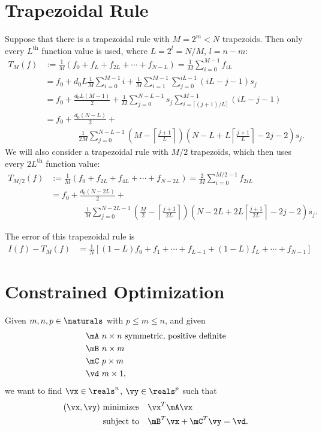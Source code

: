 \documentclass[]{amsart}
\theoremstyle{definition}
\theoremstyle{remark}
\begin{document}
\section{Trapezoidal Rule}
Suppose that there is a trapezoidal rule with $M=2^m<N$ trapezoids.  Then only every $L^{\text{th}}$ function value is used, where $L=2^l=N/M$, $l=n-m$:
\begin{align*}
T_M(f) &:= \frac{1}{M} ( f_0 + f_L + f_{2L} + \cdots + f_{N-L}) = \frac{1}{M} \sum_{i=0}^{M-1} f_{iL} \\
&= f_0 + d_0 L \frac{1}{M} \sum_{i=0}^{M-1} i + \frac{1}{M} \sum_{i=1}^{M-1}  \sum_{j=0}^{iL-1} (iL-j-1) s_j \\
&= f_0 + \frac{d_0 L(M-1)}{2} + \frac{1}{M} \sum_{j=0}^{N-L-1} s_j  \sum_{i=\lceil (j+1)/L \rceil }^{M-1}   (iL-j-1) \\
&= f_0 + \frac{d_0 (N-L)}{2} + \\
& \qquad \qquad \frac{1}{2M} \sum_{j=0}^{N-L-1} \left (M- \left\lceil \frac{j+1}{L} \right \rceil \right) \left (N - L + L\left\lceil \frac{j+1}{L} \right \rceil - 2j-2 \right)  s_j.
\end{align*}
We will also consider a trapezoidal rule with $M/2$ trapezoids, which then uses every $2L^{\text{th}}$ function value:
\begin{align*}
T_{M/2}(f) &:= \frac{1}{M} ( f_0 + f_{2L} + f_{4L} + \cdots + f_{N-2L}) = \frac{2}{M} \sum_{i=0}^{M/2-1} f_{2iL} \\
&= f_0 + \frac{d_0 (N-2L)}{2} + \\
& \qquad \qquad \frac{1}{M} \sum_{j=0}^{N-2L-1} \left (\frac{M}{2}- \left\lceil \frac{j+1}{2L} \right \rceil \right) \left (N - 2L + 2L\left\lceil \frac{j+1}{2L} \right \rceil - 2j-2 \right)  s_j.
\end{align*}


The error of this trapezoidal rule is 
\begin{align*}
I(f)-T_M(f) & = \frac{1}{N} [ (1-L) f_0 + f_1 + \cdots + f_{L-1} + (1-L) f_L + \cdots + f_{N-1}]
\end{align*}

\section{Constrained Optimization}

Given $m,n,p \in \naturals$ with $p \le m \le n$, and given
\begin{align*}
\mA \ & n \times n \text{ symmetric, positive definite} \\
\mB \ & n \times m \\
\mC \ & p \times m \\
\vd \ & m \times 1,
\end{align*}
we want to find $\vx \in \reals^n$, $\vy \in \reals^p$ such that
\begin{align*}
(\vx,\vy) \text{ minimizes} \quad & \vx^T \mA \vx\\
\text{subject to} \quad & \mB^T \vx + \mC^T \vy = \vd.
\end{align*}
\end{document}
